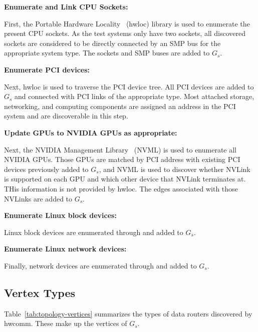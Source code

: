 \textbf{Enumerate and Link CPU Sockets:}

First, the Portable Hardware Locality~\cite{broquedis2010hwloc} (hwloc) library is used to enumerate the present CPU sockets.
As the test systems only have two sockets, all discovered sockets are considered to be directly connected by an SMP bus for the appropriate system type.
The sockets and SMP buses are added to $G_s$.

\textbf{Enumerate PCI devices:}

Next, hwloc is used to traverse the PCI device tree.
All PCI devices are added to $G_s$ and connected with PCI links of the appropriate type.
Most attached storage, networking, and computing components are assigned an address in the PCI system and are discoverable in this step.

\textbf{Update GPUs to NVIDIA GPUs as appropriate:}

Next, the NVIDIA Management Library~\cite{nvidia2017nvml} (NVML) is used to enumerate all NVIDIA GPUs.
Those GPUs are matched by PCI address with existing PCI devices previously added to $G_s$, and NVML is used to discover whether NVLink is supported on each GPU and which other device that NVLink terminates at.
THis information is not provided by hwloc.
The edges associated with those NVLinks are added to $G_s$.


\textbf{Enumerate Linux block devices:}

Linux block devices are enumerated through  and added to $G_s$.

\textbf{Enumerate Linux network devices:}

Finally, network devices are enumerated through  and added to $G_s$.

\subsection{Vertex Types}
\label{sec:system-vertices}

Table~\ref{tab:topology-vertices} summarizes the types of data routers discovered by hwcomm.
These make up the vertices of $G_s$.

